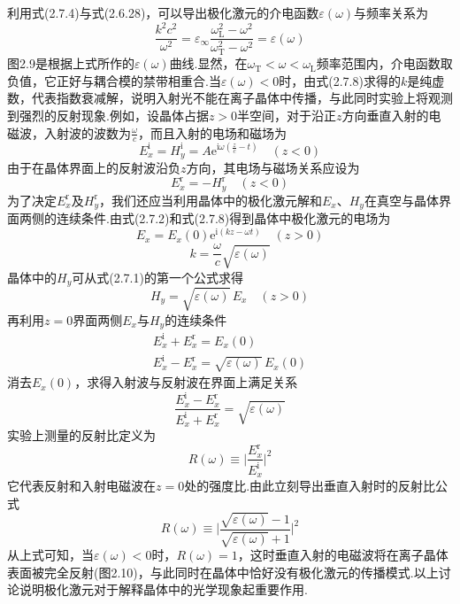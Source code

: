 利用式(2.7.4)与式(2.6.28)，可以导出极化激元的介电函数$\varepsilon(\omega)$与频率关系为
\begin{equation}
  \frac{k^2c^2}{\omega^2}=\varepsilon_{\infty}
  \frac{\omega_{\mathrm{L}}^2-\omega^2}{\omega_{\mathrm{T}}^2-\omega^2}
  =\varepsilon(\omega)
\end{equation}
图2.9是根据上式所作的$\varepsilon(\omega)$曲线.显然，在$\omega_{\mathrm{T}}<\omega<\omega_{\mathrm{L}}$频率范围内，介电函数取负值，它正好与耦合模的禁带相重合.当$\varepsilon(\omega)<0$时，由式(2.7.8)求得的$k$是纯虚数，代表指数衰减解，说明入射光不能在离子晶体中传播，与此同时实验上将观测到强烈的反射现象.例如，设晶体占据$z>0$半空间，对于沿正$z$方向垂直入射的电磁波，入射波的波数为$\frac{\omega}{c}$，而且入射的电场和磁场为
\begin{equation}
  E_x^{\mathrm{i}}=H_y^{\mathrm{i}}=A\mathrm{e}^{\mathrm{i}\omega\left(\frac{z}{c}-t\right)}
  \quad(z<0)
\end{equation}
由于在晶体界面上的反射波沿负$z$方向，其电场与磁场关系应设为
\begin{equation}
  E_x^{\mathrm{r}}=-H_y^{\mathrm{r}}\quad(z<0)
\end{equation}
为了决定$E_x^{\mathrm{r}}$及$H_y^{\mathrm{r}}$，我们还应当利用晶体中的极化激元解和$E_x$、$H_y$在真空与晶体界面两侧的连续条件.由式(2.7.2)和式(2.7.8)得到晶体中极化激元的电场为
\begin{equation}
  E_x=E_x(0)\mathrm{e}^{\mathrm{i}(kz-\omega t)}\quad(z>0)
\end{equation}
\begin{equation}
  k=\frac{\omega}{c}\sqrt{\varepsilon(\omega)}
\end{equation}
晶体中的$H_y$可从式(2.7.1)的第一个公式求得
\begin{equation}
  H_y=\sqrt{\varepsilon(\omega)}\,E_x\quad(z>0)
\end{equation}
再利用$z=0$界面两侧$E_x$与$H_y$的连续条件
\begin{equation}
\begin{gathered}
  E_x^{\mathrm{i}}+E_x^{\mathrm{r}}=E_x(0)\\[1ex]
  E_x^{\mathrm{i}}-E_x^{\mathrm{r}}=\sqrt{\varepsilon(\omega)}\,E_x(0)
\end{gathered}
\end{equation}
消去$E_x(0)$，求得入射波与反射波在界面上满足关系
\begin{equation}
  \frac{E_x^{\mathrm{i}}-E_x^{\mathrm{r}}}{E_x^{\mathrm{i}}+E_x^{\mathrm{r}}}
  =\sqrt{\varepsilon(\omega)}
\end{equation}
实验上测量的反射比定义为
\begin{equation}
  R(\omega)\equiv\biggl|\frac{E_x^{\mathrm{r}}}{E_x^{\mathrm{i}}}\biggr|^2
\end{equation}
它代表反射和入射电磁波在$z=0$处的强度比.由此立刻导出垂直入射时的反射比公式
\begin{equation}
  R(\omega)\equiv\biggl|
  \frac{\sqrt{\varepsilon(\omega)}-1}{\sqrt{\varepsilon(\omega)}+1}
  \biggr|^2
\end{equation}
从上式可知，当$\varepsilon(\omega)<0$时，$R(\omega)=1$，这时垂直入射的电磁波将在离子晶体表面被完全反射(图2.10)，与此同时在晶体中恰好没有极化激元的传播模式.以上讨论说明极化激元对于解释晶体中的光学现象起重要作用.

